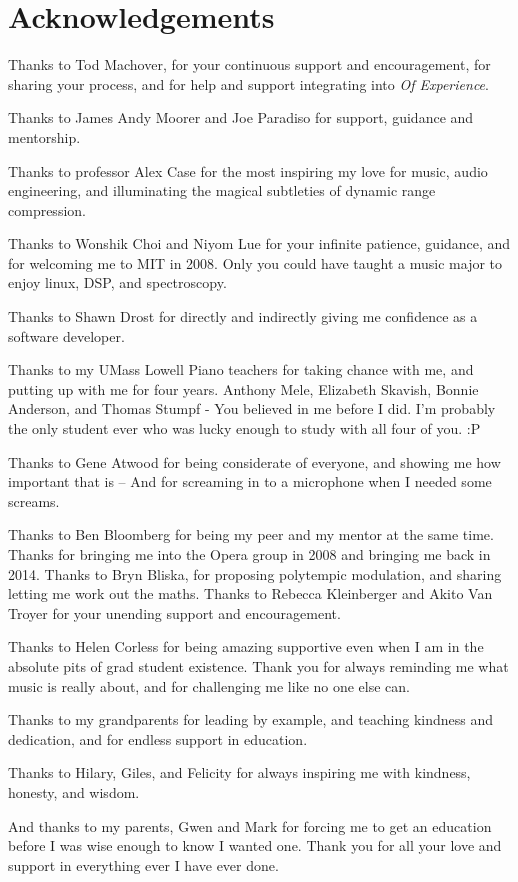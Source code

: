 \chapter*{Acknowledgements}
\label{ch:acknowledgements}

\begin{fullwidth}
Thanks to Tod Machover, for your continuous support and encouragement,
for sharing your process, and for help and support integrating \thesis
into \textit{Of Experience}.

Thanks to James Andy Moorer and Joe Paradiso for support, guidance and
mentorship.

Thanks to professor Alex Case for the most inspiring my love for
music, audio engineering, and illuminating the magical subtleties of
dynamic range compression.

Thanks to Wonshik Choi and Niyom Lue for your infinite patience,
guidance, and for welcoming me to MIT in 2008. Only you could have
taught a music major to enjoy linux, DSP, and spectroscopy.

Thanks to Shawn Drost for directly and indirectly giving me confidence
as a software developer.

Thanks to my UMass Lowell Piano teachers for taking chance with me,
and putting up with me for four years. Anthony Mele, Elizabeth
Skavish, Bonnie Anderson, and Thomas Stumpf - You believed in me
before I did. I'm probably the only student ever who was lucky enough
to study with all four of you. :P

Thanks to Gene Atwood for being considerate of everyone, and showing
me how important that is -- And for screaming in to a microphone when
I needed some screams.

Thanks to Ben Bloomberg for being my peer and my mentor at the same
time. Thanks for bringing me into the Opera group in 2008 and bringing
me back in 2014. Thanks to Bryn Bliska, for proposing polytempic
modulation, and sharing letting me work out the maths. Thanks to
Rebecca Kleinberger and Akito Van Troyer for your unending support and
encouragement. 

Thanks to Helen Corless for being amazing supportive even when I am in
the absolute pits of grad student existence. Thank you for always
reminding me what music is really about, and for challenging me like
no one else can.

Thanks to my grandparents for leading by example, and teaching
kindness and dedication, and for endless support in education.

Thanks to Hilary, Giles, and Felicity for always inspiring me with
kindness, honesty, and wisdom. 

And thanks to my parents, Gwen and Mark for forcing me to get an
education before I was wise enough to know I wanted one. Thank you for
all your love and support in everything ever I have ever done.
\end{fullwidth}
